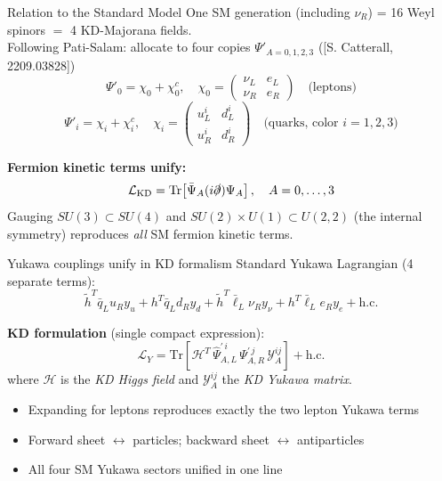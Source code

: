 \documentclass[aspectratio=169]{beamer}
\newcommand{\Blue}[1]{{\color{cptblue}#1}}
\begin{document}
\begin{frame}{Relation to the Standard Model}
  One SM generation (including $\nu_R$) = 16 Weyl spinors
  $=$ 4 KD-Majorana fields.\\[0.4em]
  Following Pati-Salam: allocate to four copies $\Psi'_{A=0,1,2,3}$ (\small [S. Catterall, 2209.03828])
  \[
    \Psi'_0 = \chi_0 + \chi_0^c,\quad
    \chi_0 = \begin{pmatrix}\nu_L & e_L \\ \nu_R & e_R\end{pmatrix}
    \quad\text{(leptons)}
  \]
  \[
    \Psi'_i = \chi_i + \chi_i^c,\quad
    \chi_i = \begin{pmatrix}u_L^i & d_L^i \\ u_R^i & d_R^i\end{pmatrix}
    \quad\text{(quarks, color }i=1,2,3)
  \]

  \vspace{0.3em}
  \textbf{Fermion kinetic terms unify:}
  \[
    \mathcal{L}_\text{KD} = \mathrm{Tr}\!\left[\bar\Psi_A(i\slashed\partial)\Psi_A\right],\quad A=0,\ldots,3
  \]
  Gauging $SU(3)\subset SU(4)$ and $SU(2)\times U(1)\subset U(2,2)$ (the internal symmetry)
  reproduces \emph{all} SM fermion kinetic terms.
\end{frame}

\begin{frame}{Yukawa couplings unify in KD formalism}
  Standard Yukawa Lagrangian (4 separate terms):
  \[
    \tilde h^T\bar q_L u_R y_u + h^T\bar q_L d_R y_d
    + \tilde h^T\bar\ell_L \nu_R y_\nu + h^T\bar\ell_L e_R y_e
    + \text{h.c.}
  \]

  \vspace{0.3em}
  \textbf{KD formulation} (single compact expression):
  \[
    \mathcal{L}_Y = \mathrm{Tr}\!\left[
      \mathcal{H}^T\,\widehat\Psi_{A,L}^{\prime\,i}\,\Psi_{A,R}^{\prime\,j}\,
      \mathcal{Y}_A^{ij}
    \right] + \text{h.c.}
  \]
  where $\mathcal{H}$ is the \emph{KD Higgs field} and
  $\mathcal{Y}_A^{ij}$ the \emph{KD Yukawa matrix}.

  \vspace{0.4em}
  \begin{itemize}
    \item Expanding for leptons reproduces exactly the two lepton Yukawa terms
    \item Forward sheet $\leftrightarrow$ particles; backward sheet $\leftrightarrow$ antiparticles
    \item \Blue{All four SM Yukawa sectors unified in one line}
  \end{itemize}
\end{frame}
\end{document}
